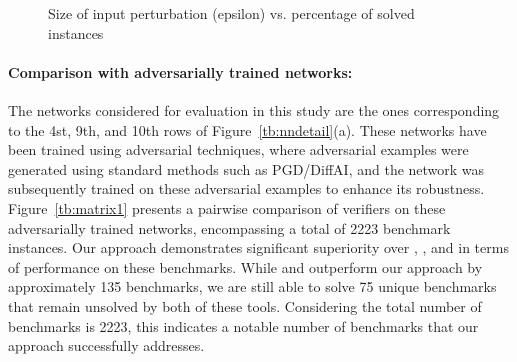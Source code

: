 \begin{figure}[]    \centering
\scalebox{0.8}{
  
  }
    \caption{Size of input perturbation (epsilon) vs. percentage of solved instances}
    \label{res:ep:milp_with_milp}
\end{figure}


\paragraph{Comparison with adversarially trained networks: }
The networks considered for evaluation in this study are the ones corresponding to the 4st, 9th, and 10th 
rows of Figure~\ref{tb:nndetail}(a). These networks have been trained using adversarial techniques, 
where adversarial examples were generated using standard methods such as PGD/DiffAI, and the network was subsequently 
trained on these adversarial examples to enhance its robustness. Figure~\ref{tb:matrix1} presents a 
pairwise comparison of verifiers on these adversarially trained networks, 
encompassing a total of 2223 benchmark instances. 
Our approach demonstrates significant superiority over \deeppoly{}, \kpoly{}, and \deepsrgr{} in terms of 
performance on these benchmarks. While \alphabeta{} and \ovaltool{} outperform our approach by approximately 
135 benchmarks, we are still able to solve 75 unique benchmarks that remain unsolved by both of these tools. 
Considering the total number of benchmarks is 2223, this indicates a notable number of benchmarks that our 
approach successfully addresses.


